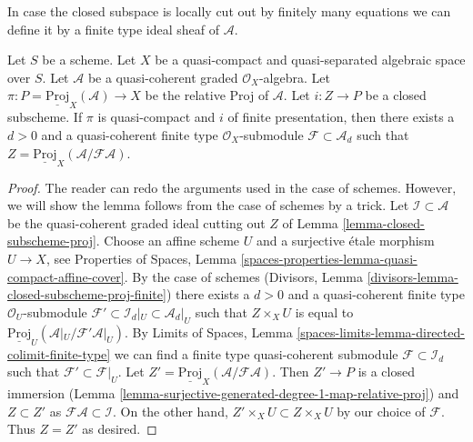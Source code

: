 \noindent
In case the closed subspace is locally cut out by finitely many
equations we can define it by a finite type ideal sheaf of
$\mathcal{A}$.

\begin{lemma}
\label{lemma-closed-subscheme-proj-finite}
Let $S$ be a scheme. Let $X$ be a quasi-compact and quasi-separated
algebraic space over $S$.
Let $\mathcal{A}$ be a quasi-coherent graded $\mathcal{O}_X$-algebra. Let
$\pi : P = \underline{\text{Proj}}_X(\mathcal{A}) \to X$ be the relative
Proj of $\mathcal{A}$. Let $i : Z \to P$ be a closed subscheme.
If $\pi$ is quasi-compact and $i$ of finite presentation, then there exists
a $d > 0$ and a quasi-coherent finite type $\mathcal{O}_X$-submodule
$\mathcal{F} \subset \mathcal{A}_d$ such that
$Z = \underline{\text{Proj}}_X(\mathcal{A}/\mathcal{F}\mathcal{A})$.
\end{lemma}

\begin{proof}
The reader can redo the arguments used in the case of schemes. However, we
will show the lemma follows from the case of schemes by a trick.
Let $\mathcal{I} \subset \mathcal{A}$ be the quasi-coherent graded
ideal cutting out $Z$ of Lemma \ref{lemma-closed-subscheme-proj}.
Choose an affine scheme $U$ and a surjective \'etale morphism
$U \to X$, see Properties of Spaces, Lemma
\ref{spaces-properties-lemma-quasi-compact-affine-cover}.
By the case of schemes
(Divisors, Lemma \ref{divisors-lemma-closed-subscheme-proj-finite})
there exists a $d > 0$ and a quasi-coherent finite type
$\mathcal{O}_U$-submodule
$\mathcal{F}' \subset \mathcal{I}_d|_U \subset \mathcal{A}_d|_U$
such that $Z \times_X U$ is equal to
$\underline{\text{Proj}}_U(\mathcal{A}|_U/\mathcal{F}'\mathcal{A}|_U)$.
By Limits of Spaces, Lemma
\ref{spaces-limits-lemma-directed-colimit-finite-type}
we can find a finite type quasi-coherent submodule
$\mathcal{F} \subset \mathcal{I}_d$ such that
$\mathcal{F}' \subset \mathcal{F}|_U$. Let
$Z' = \underline{\text{Proj}}_X(\mathcal{A}/\mathcal{F}\mathcal{A})$.
Then $Z' \to P$ is a closed immersion
(Lemma \ref{lemma-surjective-generated-degree-1-map-relative-proj})
and $Z \subset Z'$ as $\mathcal{F}\mathcal{A} \subset \mathcal{I}$.
On the other hand, $Z' \times_X U \subset Z \times_X U$ by our
choice of $\mathcal{F}$. Thus $Z = Z'$ as desired.
\end{proof}

